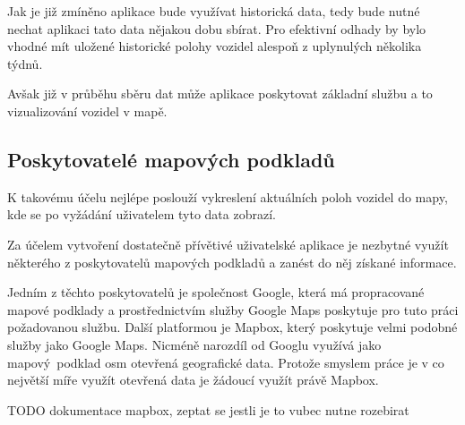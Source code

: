 Jak je již zmíněno aplikace bude využívat historická data, tedy bude nutné nechat aplikaci tato data nějakou dobu sbírat. Pro efektivní odhady by bylo vhodné mít uložené historické polohy vozidel alespoň z uplynulých několika týdnů.

\bigbreak

Avšak již v průběhu sběru dat může aplikace poskytovat základní službu a to vizualizování vozidel v mapě.

\subsection{Poskytovatelé mapových podkladů}

K takovému účelu nejlépe poslouží vykreslení aktuálních poloh vozidel do mapy, kde se po vyžádání uživatelem tyto data zobrazí.

\bigbreak

Za účelem vytvoření dostatečně přívětivé uživatelské aplikace je nezbytné využít některého z poskytovatelů mapových podkladů a zanést do něj získané informace.

\bigbreak

Jedním z těchto poskytovatelů je společnost Google, která má propracované mapové podklady a prostřednictvím služby Google Maps poskytuje pro tuto práci požadovanou službu. Další platformou je Mapbox, který poskytuje velmi podobné služby jako Google Maps. Nicméně narozdíl od Googlu využívá jako mapový podklad \gls{osm} {otevřená geografické data}. Protože smyslem práce je v co největší míře využít otevřená data je žádoucí využít právě Mapbox.

\bigbreak

TODO dokumentace mapbox, zeptat se jestli je to vubec nutne rozebirat
